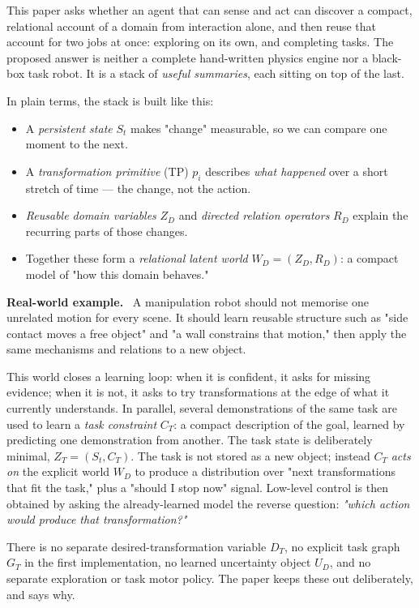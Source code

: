 \documentclass[11pt]{article}
\newenvironment{example}{%
  \par\smallskip\noindent\begin{minipage}{\textwidth}%
  \color{teal!60!black}\small
  \textbf{\color{teal!70!black}Real-world example.}\
}{%
  \end{minipage}\par\smallskip}
\begin{document}
This paper asks whether an agent that can sense and act can discover a compact, relational account of a domain from
interaction alone, and then reuse that account for two jobs at once: exploring on its own, and completing tasks.
The proposed answer is neither a complete hand-written physics engine nor a black-box task robot. It is a stack of
\emph{useful summaries}, each sitting on top of the last.

In plain terms, the stack is built like this:

\begin{itemize}
\item A \emph{persistent state} $S_t$ makes "change" measurable, so we can compare one moment to the next.
\item A \emph{transformation primitive} (TP) $p_i$ describes \emph{what happened} over a short stretch of time --- the change, not the action.
\item \emph{Reusable domain variables} $Z_D$ and \emph{directed relation operators} $R_D$ explain the recurring parts of those changes.
\item Together these form a \emph{relational latent world} $W_D=(Z_D,R_D)$: a compact model of "how this domain behaves."
\end{itemize}

\begin{example}
A manipulation robot should not memorise one unrelated motion for every scene. It should learn reusable structure such as
"side contact moves a free object" and "a wall constrains that motion," then apply the same mechanisms and relations to a new object.
\end{example}

This world closes a learning loop: when it is confident, it asks for missing evidence; when it is not, it asks to try
transformations at the edge of what it currently understands. In parallel, several demonstrations of the same task are used to
learn a \emph{task constraint} $C_T$: a compact description of the goal, learned by predicting one demonstration from another.
The task state is deliberately minimal, $Z_T=(S_t,C_T)$. The task is not stored as a new object; instead $C_T$ \emph{acts on} the
explicit world $W_D$ to produce a distribution over "next transformations that fit the task," plus a "should I stop now" signal.
Low-level control is then obtained by asking the already-learned model the reverse question: \emph{"which action would produce
that transformation?"}

There is no separate desired-transformation variable $D_T$, no explicit task graph $G_T$ in the first implementation, no learned
uncertainty object $U_D$, and no separate exploration or task motor policy. The paper keeps these out deliberately, and says why.
\end{document}
